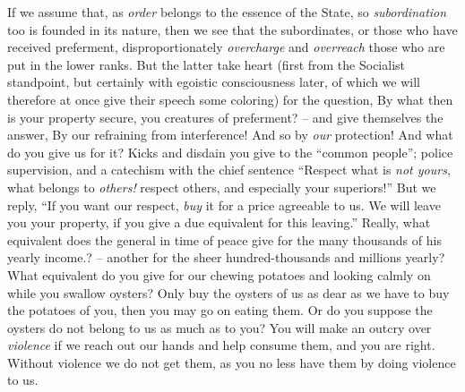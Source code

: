 If we assume that, as \textit{order} belongs to the essence of the State, so 
\textit{subordination} too is founded in its nature, then we see that the 
subordinates, or those who have received preferment, disproportionately 
\textit{overcharge} and \textit{overreach} those who are put in the lower 
ranks. But the latter take heart (first from the Socialist standpoint, but 
certainly with egoistic consciousness later, of which we will therefore at 
once give their speech some coloring) for the question, By what then is your 
property secure, you creatures of preferment? -- and give themselves the 
answer, By our refraining from interference! And so by \textit{our} 
protection! And what do you give us for it? Kicks and disdain you give to the 
``common people''; police supervision, and a catechism with the chief 
sentence ``Respect what is \textit{not yours}, what belongs to 
\textit{others!} respect others, and especially your superiors!'' But we 
reply, ``If you want our respect, \textit{buy} it for a price agreeable to 
us. We will leave you your property, if you give a due equivalent for this 
leaving.'' Really, what equivalent does the general in time of peace give for 
the many thousands of his yearly income.? -- another for the sheer 
hundred-thousands and millions yearly? What equivalent do you give for our 
chewing potatoes and looking calmly on while you swallow oysters? Only buy the 
oysters of us as dear as we have to buy the potatoes of you, then you may go 
on eating them. Or do you suppose the oysters do not belong to us as much as 
to you? You will make an outcry over \textit{violence} if we reach out our 
hands and help consume them, and you are right. Without violence we do not get 
them, as you no less have them by doing violence to us.


